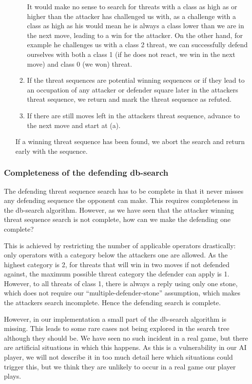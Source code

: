\documentclass[10pt]{article}
\begin{document}
\begin{enumerate}
\begin{enumerate}
It would make no sense to search for threats with a class as high as or higher
than the attacker has challenged us with, as a challenge with a class as high
as his would mean he is always a class lower than we are in the next move,
leading to a win for the attacker.  On the other hand, for example he
challenges us with a class 2 threat, we can successfully defend ourselves with
both a class 1 (if he does not react, we win in the next move) and class 0 (we
won) threat.
	\item If the threat sequences are potential winning sequences or if they
lead to an occupation of any attacker or defender square later in the
attackers threat sequence, we return and mark the threat sequence as refuted.
	\item If there are still moves left in the attackers threat sequence,
advance to the next move and start at (a).
\end{enumerate}

If a winning threat sequence has been found, we abort the search and return
early with the sequence.
\end{enumerate}

\subsubsection{Completeness of the defending db-search}

The defending threat sequence search has to be complete in that it never
misses any defending sequence the opponent can make.  This requires
completeness in the db-search algorithm.  However, as we have seen that the
attacker winning threat sequence search is not complete, how can we make the
defending one complete?

This is achieved by restricting the number of applicable operators
drastically: only operators with a category below the attackers one are
allowed.  As the highest category is 2, for threats that will win in two moves
if not defended against, the maximum possible threat category the defender can
apply is 1.  However, to all threats of class 1, there is always a reply using
only one stone, which does not require our ``multiple-defender-stone''
assumption, which makes the attackers search incomplete.  Hence the defending
search is complete.

However, in our implementation a small part of the db-search algorithm is
missing.  This leads to some rare cases not being explored in the search tree
although they should be.  We have seen no such incident in a real game, but
there are artificial situations in which this happens.  As this is a
vulnerability in our AI player, we will not describe it in too much detail
here which situations could trigger this, but we think they are unlikely to
occur in a real game our player plays.
\end{document}
